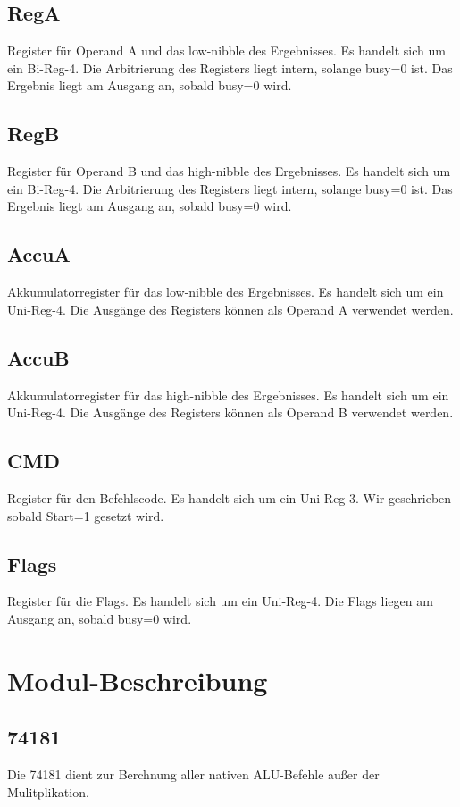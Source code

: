 \documentclass[11pt]{report}
\begin{document}
	\subsection{RegA}
	Register für Operand A und das low-nibble des Ergebnisses.
	Es handelt sich um ein Bi-Reg-4.
	Die Arbitrierung des Registers liegt intern, solange busy=0 ist.
	Das Ergebnis liegt am Ausgang an, sobald busy=0 wird.
	
	\subsection{RegB}
	Register für Operand B und das high-nibble des Ergebnisses.
	Es handelt sich um ein Bi-Reg-4.
	Die Arbitrierung des Registers liegt intern, solange busy=0 ist.
	Das Ergebnis liegt am Ausgang an, sobald busy=0 wird.
	
	\subsection{AccuA}
	Akkumulatorregister für das low-nibble des Ergebnisses.
	Es handelt sich um ein Uni-Reg-4.
	Die Ausgänge des Registers können als Operand A verwendet werden.
	
	\subsection{AccuB}
	Akkumulatorregister für das high-nibble des Ergebnisses.
	Es handelt sich um ein Uni-Reg-4.
	Die Ausgänge des Registers können als Operand B verwendet werden.
	
	\subsection{CMD}
	Register für den Befehlscode.
	Es handelt sich um ein Uni-Reg-3. Wir geschrieben sobald Start=1 gesetzt wird.
	
	\subsection{Flags}
	Register für die Flags.
	Es handelt sich um ein Uni-Reg-4.
	Die Flags liegen am Ausgang an, sobald busy=0 wird.
	
	
	\section{Modul-Beschreibung}
	\subsection{74181}
	Die 74181 dient zur Berchnung aller nativen ALU-Befehle außer der Mulitplikation.
	
\end{document}
